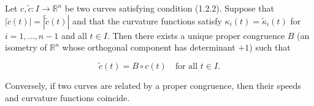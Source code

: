 Let $c, \tilde{c}: I \to \mathbb{R}^n$ be two curves satisfying condition (1.2.2). Suppose that $|\dot{c}(t)| = |\dot{\tilde{c}}(t)|$ and that the curvature functions satisfy $\kappa_i(t) = \tilde{\kappa}_i(t)$ for $i = 1, \dots, n-1$ and all $t \in I$. Then there exists a unique proper congruence $B$ (an isometry of $\mathbb{R}^n$ whose orthogonal component has determinant $+1$) such that

$$\tilde{c}(t) = B \circ c(t) \quad \text{for all } t \in I.$$

Conversely, if two curves are related by a proper congruence, then their speeds and curvature functions coincide.
